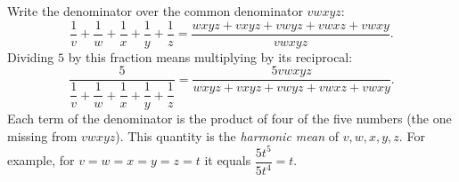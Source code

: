 Write the denominator over the common denominator $vwxyz$:
\[\dfrac1v+\dfrac1w+\dfrac1x+\dfrac1y+\dfrac1z=\dfrac{wxyz+vxyz+vwyz+vwxz+vwxy}{vwxyz}.\]
Dividing $5$ by this fraction means multiplying by its reciprocal:
\[\dfrac{5}{\dfrac1v+\dfrac1w+\dfrac1x+\dfrac1y+\dfrac1z}=\boxed{\dfrac{5vwxyz}{wxyz+vxyz+vwyz+vwxz+vwxy}}.\]
Each term of the denominator is the product of four of the five numbers (the one missing from $vwxyz$). This quantity is the \emph{harmonic mean} of $v,w,x,y,z$. For example, for $v=w=x=y=z=t$ it equals $\dfrac{5t^5}{5t^4}=t$.
